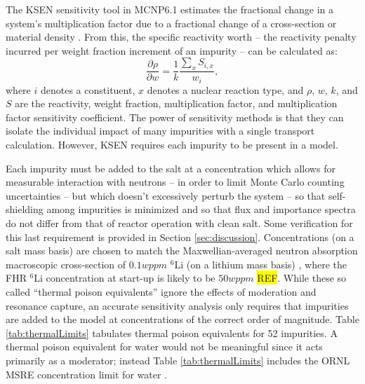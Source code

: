 \documentclass[11pt]{article}
\newcommand{\iso}[2]{$^{#2}\mathrm{#1}$}
\newcommand{\REF}[0]{\colorbox{yellow}{REF}}
\begin{document}
The KSEN sensitivity tool in MCNP6.1 estimates the fractional change in a system's multiplication factor due to a fractional change of a cross-section or material density \cite{lanl2013mcnp6,kiedrowski2013abk}.
From this, the specific reactivity worth -- the reactivity penalty incurred per weight fraction increment of an impurity -- can be calculated as:
\begin{equation}
    \frac{\partial\rho}{\partial w}
    = \frac{1}{k} \frac{\sum_x{S_{i,x}}}{w_i}
    ,
\end{equation}
where $i$ denotes a constituent, $x$ denotes a nuclear reaction type, and $\rho$, $w$, $k$, and $S$ are the reactivity, weight fraction, multiplication factor, and multiplication factor sensitivity coefficient.
The power of sensitivity methods is that they can isolate the individual impact of many impurities with a single transport calculation.
However, KSEN requires each impurity to be present in a model.

Each impurity must be added to the salt at a concentration which allows for measurable interaction with neutrons -- in order to limit Monte Carlo counting uncertainties -- but which doesn't excessively perturb the system -- so that self-shielding among impurities is minimized and so that flux and importance spectra do not differ from that of reactor operation with clean salt.
Some verification for this last requirement is provided in Section \ref{sec:discussion}.
Concentrations (on a salt mass basis) are chosen to match the Maxwellian-averaged neutron absorption macroscopic cross-section of $0.1wppm$ \iso{Li}{6} (on a lithium mass basis) \cite{mughabghab2003tnc} \cite{holden1999tdw}, where the FHR \iso{Li}{6} concentration at start-up is likely to be $50wppm$ \REF.
While these so called ``thermal poison equivalents'' ignore the effects of moderation and resonance capture, an accurate sensitivity analysis only requires that impurities are added to the model at concentrations of the correct order of magnitude.
Table \ref{tab:thermalLimits} tabulates thermal poison equivalents for 52 impurities.
A thermal poison equivalent for water would not be meaningful since it acts primarily as a moderator; instead  Table \ref{tab:thermalLimits} includes the ORNL MSRE concentration limit for water \cite{shaffer1971phs}.
\end{document}
